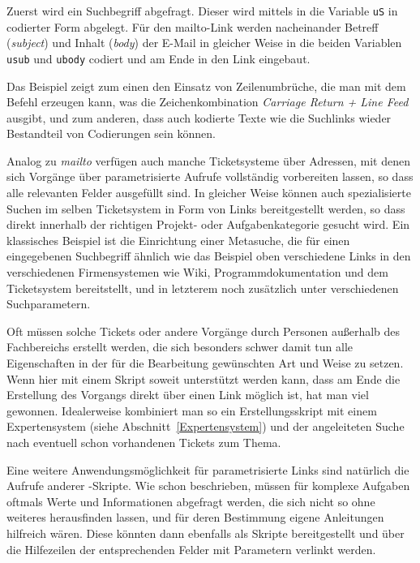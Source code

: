 Zuerst wird ein Suchbegriff abgefragt. Dieser wird mittels  in die Variable \verb|uS| in codierter Form abgelegt. Für den mailto-Link werden nacheinander Betreff (\emph{subject}) und Inhalt (\emph{body}) der E-Mail in gleicher Weise in die beiden Variablen \verb|usub| und \verb|ubody| codiert und am Ende in den Link eingebaut.

Das Beispiel zeigt zum einen den Einsatz von Zeilenumbrüche, die man mit dem Befehl  erzeugen kann, was die Zeichenkombination \emph{Carriage Return + Line Feed} ausgibt, und zum anderen, dass auch kodierte Texte wie die Suchlinks wieder Bestandteil von Codierungen sein können. 

Analog zu \emph{mailto} verfügen auch manche Ticketsysteme über Adressen, mit denen sich Vorgänge über parametrisierte Aufrufe vollständig vorbereiten lassen, so dass alle relevanten Felder ausgefüllt sind. In gleicher Weise können auch spezialisierte Suchen im selben Ticketsystem in Form von Links bereitgestellt werden, so dass direkt innerhalb der richtigen Projekt- oder Aufgabenkategorie gesucht wird. Ein klassisches Beispiel ist die Einrichtung einer Metasuche, die für einen eingegebenen Suchbegriff ähnlich wie das Beispiel oben verschiedene Links in den verschiedenen Firmensystemen wie Wiki, Programmdokumentation und dem Ticketsystem bereitstellt, und in letzterem noch zusätzlich unter verschiedenen Suchparametern.

Oft müssen solche Tickets oder andere Vorgänge durch Personen außerhalb des Fachbereichs erstellt werden, die sich besonders schwer damit tun alle Eigenschaften in der für die Bearbeitung gewünschten Art und Weise zu setzen. Wenn hier mit einem Skript soweit unterstützt werden kann, dass am Ende die Erstellung des Vorgangs direkt über einen Link möglich ist, hat man viel gewonnen. Idealerweise kombiniert man so ein Erstellungsskript mit einem Expertensystem (siehe Abschnitt~\ref{Expertensystem}) und der angeleiteten Suche nach eventuell schon vorhandenen Tickets zum Thema.

Eine weitere Anwendungsmöglichkeit für parametrisierte Links sind natürlich die Aufrufe anderer \FPZb-Skripte. Wie schon beschrieben, müssen für komplexe Aufgaben oftmals Werte und Informationen abgefragt werden, die sich nicht so ohne weiteres herausfinden lassen, und für deren Bestimmung eigene Anleitungen hilfreich wären. Diese könnten dann ebenfalls als Skripte bereitgestellt und über die Hilfezeilen der entsprechenden Felder mit Parametern verlinkt werden.

